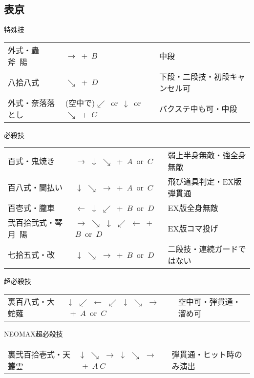 \documentclass[a4j,11pt]{jarticle}
\begin{document}
\subsection{表京}
\begin{itembox}[l]{特殊技}
\begin{tabular}{lll}
外式・轟斧\ 陽&$\rightarrow$\ +\ $B$&中段\\
八拾八式&$\searrow$\ +\ $D$&下段・二段技・初段キャンセル可\\
外式・奈落落とし&(空中で)$\swarrow$\ or\ $\downarrow$\ or\ $\searrow$\ +\ $C$&バクステ中も可・中段
\end{tabular}
\end{itembox}
\begin{itembox}[l]{必殺技}
\begin{tabular}{lll}
百式・鬼焼き&$\rightarrow$ $\downarrow$ $\searrow$\ +\ $A$\ or\ $C$&弱上半身無敵・強全身無敵\\
百八式・闇払い&$\downarrow$ $\searrow$ $\rightarrow$\ +\ $A$\ or\ $C$&飛び道具判定・EX版弾貫通\\ 
百壱式・朧車&$\leftarrow$ $\downarrow$ $\swarrow$\ +\ $B$\ or\ $D$&EX版全身無敵\\
弐百拾弐式・琴月\ 陽&$\rightarrow$ $\searrow$ $\downarrow$ $\swarrow$ $\leftarrow$\ +\ $B$\ or\ $D$&EX版コマ投げ\\
七拾五式・改&$\downarrow$ $\searrow$ $\rightarrow$\ +\ $B$\ or\ $D$&二段技・連続ガードではない
\end{tabular}
\end{itembox}
\begin{itembox}[l]{超必殺技}
\begin{tabular}{lll}
裏百八式・大蛇薙&$\downarrow$ $\swarrow$ $\leftarrow$ $\swarrow$ $\downarrow$ $\searrow$ $\rightarrow$\ +\ $A$\ or\ $C$& 空中可・弾貫通・溜め可
\end{tabular}
\end{itembox}
\begin{itembox}[l]{NEOMAX超必殺技}
\begin{tabular}{lll}
裏弐百拾壱式・天叢雲&$\downarrow$ $\searrow$ $\rightarrow$ $\downarrow$ $\searrow$ $\rightarrow$\ +\ $A\ C$&弾貫通・ヒット時のみ演出
\end{tabular}
\end{itembox}
\newpage
\end{document}
